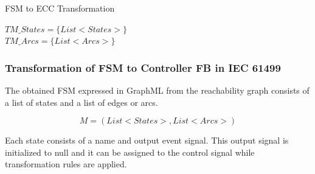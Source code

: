 \begin{bibunit}
\begin{algorithm}
\caption{FSM to ECC Transformation}\label{alg:two}
$TM\_States = \{List<States> \}$ \\
$TM\_Arcs = \{List<Arcs> \}$ \\
\end{algorithm}

\hfill
\subsubsection{Transformation of FSM to Controller FB in IEC 61499}
\hfill

The obtained  FSM expressed in GraphML  from the reachability graph consists of a list of states and a list of  edges or arcs.

  \begin{equation}\label{eqn:1}
    M = (List<States>,List<Arcs>)
  \end{equation}
  
Each state consists of a name and output event signal. This output signal is initialized to null and it can be assigned to the control signal while transformation rules are applied. 


\end{bibunit}
